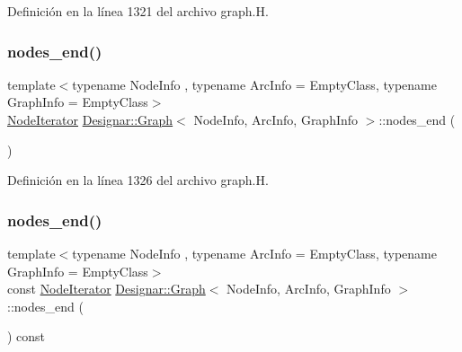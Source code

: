 Definición en la línea 1321 del archivo graph.\+H.

\mbox{\label{class_designar_1_1_graph_a9f51b69f8827aabfe5b23f82e9bc5a4d}} 
\subsubsection{\texorpdfstring{nodes\+\_\+end()}{nodes\_end()}\hspace{0.1cm}{\footnotesize\ttfamily [1/2]}}
{\footnotesize\ttfamily template$<$typename Node\+Info , typename Arc\+Info  = Empty\+Class, typename Graph\+Info  = Empty\+Class$>$ \\
\hyperlink{class_designar_1_1_graph_1_1_node_iterator}{Node\+Iterator} \hyperlink{class_designar_1_1_graph}{Designar\+::\+Graph}$<$ Node\+Info, Arc\+Info, Graph\+Info $>$\+::nodes\+\_\+end (\begin{DoxyParamCaption}{ }\end{DoxyParamCaption})\hspace{0.3cm}{\ttfamily [inline]}}



Definición en la línea 1326 del archivo graph.\+H.

\mbox{\label{class_designar_1_1_graph_abb7e32a8a05850e788f4017677965b49}} 
\subsubsection{\texorpdfstring{nodes\+\_\+end()}{nodes\_end()}\hspace{0.1cm}{\footnotesize\ttfamily [2/2]}}
{\footnotesize\ttfamily template$<$typename Node\+Info , typename Arc\+Info  = Empty\+Class, typename Graph\+Info  = Empty\+Class$>$ \\
const \hyperlink{class_designar_1_1_graph_1_1_node_iterator}{Node\+Iterator} \hyperlink{class_designar_1_1_graph}{Designar\+::\+Graph}$<$ Node\+Info, Arc\+Info, Graph\+Info $>$\+::nodes\+\_\+end (\begin{DoxyParamCaption}{ }\end{DoxyParamCaption}) const\hspace{0.3cm}{\ttfamily [inline]}}



